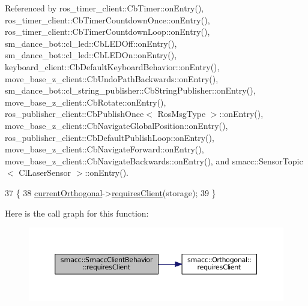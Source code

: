 Referenced by ros\+\_\+timer\+\_\+client\+::\+Cb\+Timer\+::on\+Entry(), ros\+\_\+timer\+\_\+client\+::\+Cb\+Timer\+Countdown\+Once\+::on\+Entry(), ros\+\_\+timer\+\_\+client\+::\+Cb\+Timer\+Countdown\+Loop\+::on\+Entry(), sm\+\_\+dance\+\_\+bot\+::cl\+\_\+led\+::\+Cb\+L\+E\+D\+Off\+::on\+Entry(), sm\+\_\+dance\+\_\+bot\+::cl\+\_\+led\+::\+Cb\+L\+E\+D\+On\+::on\+Entry(), keyboard\+\_\+client\+::\+Cb\+Default\+Keyboard\+Behavior\+::on\+Entry(), move\+\_\+base\+\_\+z\+\_\+client\+::\+Cb\+Undo\+Path\+Backwards\+::on\+Entry(), sm\+\_\+dance\+\_\+bot\+::cl\+\_\+string\+\_\+publisher\+::\+Cb\+String\+Publisher\+::on\+Entry(), move\+\_\+base\+\_\+z\+\_\+client\+::\+Cb\+Rotate\+::on\+Entry(), ros\+\_\+publisher\+\_\+client\+::\+Cb\+Publish\+Once$<$ Ros\+Msg\+Type $>$\+::on\+Entry(), move\+\_\+base\+\_\+z\+\_\+client\+::\+Cb\+Navigate\+Global\+Position\+::on\+Entry(), ros\+\_\+publisher\+\_\+client\+::\+Cb\+Default\+Publish\+Loop\+::on\+Entry(), move\+\_\+base\+\_\+z\+\_\+client\+::\+Cb\+Navigate\+Forward\+::on\+Entry(), move\+\_\+base\+\_\+z\+\_\+client\+::\+Cb\+Navigate\+Backwards\+::on\+Entry(), and smacc\+::\+Sensor\+Topic$<$ Cl\+Laser\+Sensor $>$\+::on\+Entry().


\begin{DoxyCode}
37 \{
38     \hyperlink{classsmacc_1_1SmaccClientBehavior_a642742da14ffa20e323a03eefecfc8b2}{currentOrthogonal}->\hyperlink{classsmacc_1_1Orthogonal_abcde9f489cdf94acca381ea67649a723}{requiresClient}(storage);
39 \}
\end{DoxyCode}


Here is the call graph for this function\+:
\nopagebreak
\begin{figure}[H]
\begin{center}
\leavevmode
\includegraphics[width=350pt]{classsmacc_1_1SmaccClientBehavior_a917f001e763a1059af337bf4e164f542_cgraph}
\end{center}
\end{figure}




